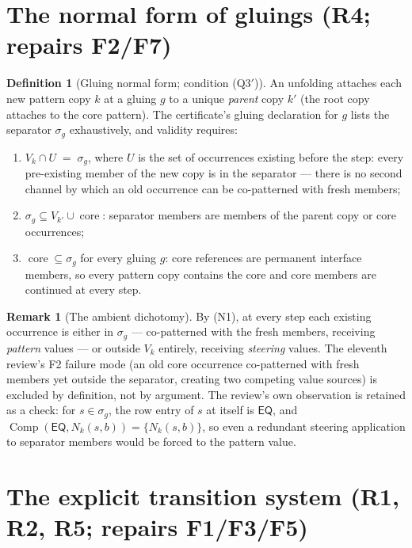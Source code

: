 \documentclass[11pt]{article}
\theoremstyle{definition}
\newtheorem{definition}[theorem]{Definition}
\newtheorem{remark}[theorem]{Remark}
\newcommand{\EQ}{\mathsf{EQ}}
\newcommand{\Comp}{\operatorname{Comp}}
\newcommand{\core}{\operatorname{core}}
\begin{document}
\section{The normal form of gluings (R4; repairs F2/F7)}\label{sec:normal}

\begin{definition}[Gluing normal form; condition (Q3$'$)]\label{def:nf}
An unfolding attaches each new pattern copy $k$ at a gluing $g$ to a
unique \emph{parent} copy $k'$ (the root copy attaches to the core
pattern).  The certificate's gluing declaration for $g$ lists the
separator $\sigma_g$ exhaustively, and validity requires:
\begin{enumerate}[label=(N\arabic*),leftmargin=2.6em]
\item $V_k\cap U \;=\; \sigma_g$, where $U$ is the set of occurrences
existing before the step: every pre-existing member of the new copy is
in the separator --- there is no second channel by which an old
occurrence can be co-patterned with fresh members;
\item $\sigma_g\subseteq V_{k'}\cup\core$: separator members are
members of the parent copy or core occurrences;
\item $\core\subseteq\sigma_g$ for every gluing $g$: core references
are permanent interface members, so every pattern copy contains the
core and core members are continued at every step.
\end{enumerate}
\end{definition}

\begin{remark}[The ambient dichotomy]
By (N1), at every step each existing occurrence is either in
$\sigma_g$ --- co-patterned with the fresh members, receiving
\emph{pattern} values --- or outside $V_k$ entirely, receiving
\emph{steering} values.  The eleventh review's F2 failure mode (an old
core occurrence co-patterned with fresh members yet outside the
separator, creating two competing value sources) is excluded by
definition, not by argument.  The review's own observation is retained
as a check: for $s\in\sigma_g$, the row entry of $s$ at itself is
$\EQ$, and $\Comp(\EQ,N_k(s,b))=\{N_k(s,b)\}$, so even a redundant
steering application to separator members would be forced to the
pattern value.
\end{remark}

\section{The explicit transition system (R1, R2, R5; repairs F1/F3/F5)}
\label{sec:ts}
\end{document}
